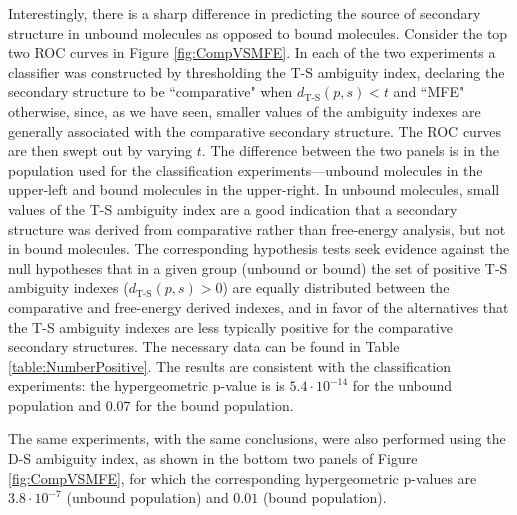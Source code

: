 \documentclass[10pt,letterpaper]{article}
\begin{document}
Interestingly, there is a sharp difference in predicting the source of secondary structure in unbound molecules as opposed to bound molecules. Consider the top two ROC curves in Figure
\ref{fig:CompVSMFE}. In each of the two experiments a classifier was constructed by thresholding the T-S ambiguity index, declaring the secondary structure to be 
``comparative" when $d_\text{T-S}(p,s)<t$ and ``MFE" otherwise, since, as we have seen, smaller values of the ambiguity indexes are generally associated with the comparative secondary structure. The ROC curves are then swept out by varying $t$. The difference between the two panels is in the population used for the classification experiments---unbound molecules in the upper-left and bound molecules in the upper-right. In unbound molecules, small values of the T-S ambiguity index are a good indication that a secondary structure was derived from comparative rather than free-energy analysis, but not in bound molecules. The corresponding hypothesis tests seek evidence against the null hypotheses that in a given group (unbound or bound) the set of positive T-S ambiguity indexes ($d_\text{T-S}(p,s)>0$) are equally distributed between the comparative and free-energy derived indexes, and in favor of the alternatives that the T-S ambiguity indexes are less typically positive for the comparative secondary structures. The necessary data can be found in Table \ref{table:NumberPositive}. The results are consistent with the classification experiments: the hypergeometric p-value is 
is $5.4\cdot 10^{-14}$ for the unbound population and $0.07$ for the bound population.

The same experiments, with the same conclusions, were also performed using the D-S ambiguity index, as shown in the bottom two panels of Figure \ref{fig:CompVSMFE}, for which the corresponding hypergeometric p-values are $3.8\cdot 10^{-7}$ (unbound population) and
$0.01$ (bound population). 



\end{document}
